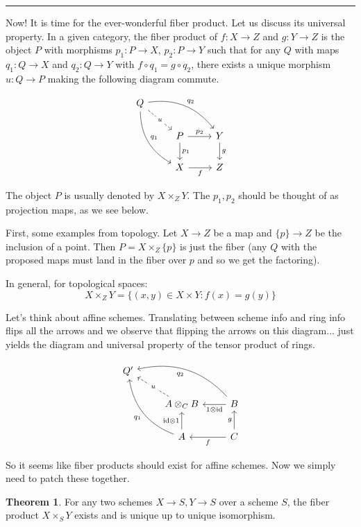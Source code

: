 \documentclass[10pt,reqno]{amsart}
\theoremstyle{definition}
\newtheorem{theorem}{Theorem}
\theoremstyle{remark}
\numberwithin{equation}{section}
\numberwithin{theorem}{section}
\begin{document}
\hrule
\vspace{1em}

Now! It is time for the ever-wonderful fiber product. Let us discuss its universal property. In a given category, the fiber product of $f: X \to Z$ and $g: Y \to Z$ is the object $P$ with morphisms ${p_1: P \to X}$, ${p_2: P \to Y}$ such that for any $Q$ with maps $q_1: Q \to X$ and $q_2: Q \to Y$ with $f \circ q_1 = g \circ q_2$, there exists a unique morphism $u: Q \to P$ making the following diagram commute.

\[\begin{tikzcd}
Q
\arrow[drr, bend left, "q_2"]
\arrow[ddr, bend right, "q_1"]
\arrow[dr, dashed, "u" description] & & \\
& P \arrow[r, "p_2"] \arrow[d, "p_1"]
& Y \arrow[d, "g"] \\
& X \arrow[r, swap, "f"]
& Z
\end{tikzcd}\]

The object $P$ is usually denoted by $X \times_Z Y$. The $p_1,p_2$ should be thought of as projection maps, as we see below.

First, some examples from topology. Let $X \to Z$ be a map and $\{p\} \to Z$ be the inclusion of a point. Then $P = X \times_Z \{p\}$ is just the fiber (any $Q$ with the proposed maps must land in the fiber over $p$ and so we get the factoring).

In general, for topological spaces:
\[X \times_Z Y = \{(x,y) \in X \times Y: f(x) = g(y)\}\]

Let's think about affine schemes. Translating between scheme info and ring info flips all the arrows and we observe that flipping the arrows on this diagram... just yields the diagram and universal property of the tensor product of rings.

\[\begin{tikzcd}
Q'& & \\
& A \otimes_C B \arrow[ul, dashed, "u" description] 
& B \arrow[l, "1 \otimes \text{id}"] \arrow[ull, bend right, "q_2"] \\
& A  \arrow[u, "\text{id} \otimes 1"] \arrow[uul, bend left, "q_1"]
& C \arrow[l, "f"] \arrow[u,"g"]
\end{tikzcd}\]

So it seems like fiber products should exist for affine schemes. Now we simply need to patch these together.

\begin{theorem} For any two schemes $X \to S, Y \to S$ over a scheme $S$, the fiber product $X \times_S Y$ exists and is unique up to unique isomorphism.
\end{theorem}
\end{document}
